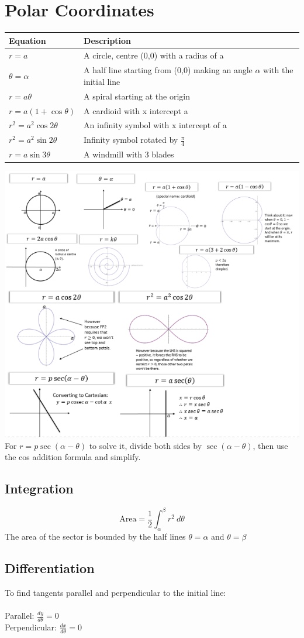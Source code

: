 \documentclass{article}[18pt]
\begin{document}
\section{Polar Coordinates}
\begin{tabularx}{\textwidth}{|X|X|}
\hline
Equation&Description\\
\hline
$r=a$&A circle, centre (0,0) with a radius of a\\
\hline
$\theta=\alpha$&A half line starting from (0,0) making an angle $\alpha$ with the initial line\\
\hline
$r=a\theta$&A spiral starting at the origin\\
\hline
$r=a(1+\cos\theta)$&A cardioid with x intercept a\\
\hline
$r^2=a^2\cos2\theta$&An infinity symbol with x intercept of a\\
\hline
$r^2=a^2\sin2\theta$&Infinity symbol rotated by $\frac{\pi}{4}$\\
\hline
$r=a\sin3\theta$&A windmill with 3 blades\\
\hline
\end{tabularx}
\newpage
\includegraphics[width=18cm]{polar.png}\\
For $r=p\sec(\alpha-\theta)$ to solve it, divide both sides by $\sec(\alpha-\theta)$, then use the cos addition formula and simplify.
\subsection{Integration}
$$\textrm{Area}=\frac{1}{2}\int_\alpha^\beta r^2 \ d\theta$$
The area of the sector is bounded by the half lines $\theta=\alpha$ and $\theta=\beta$
\subsection{Differentiation}
To find tangents parallel and perpendicular to the initial line:\\
\\
Parallel: $\frac{dy}{d\theta}=0$\\
Perpendicular: $\frac{dx}{d\theta}=0$
\end{document}
